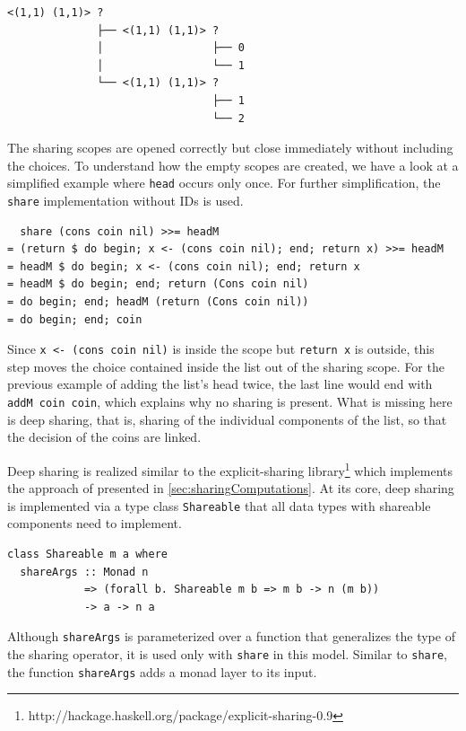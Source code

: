 \documentclass[a4paper, 11pt, fleqn, twoside]{scrreprt}
\newcommand{\todo}[1]{\marginpar{\textbf{TODO:} #1}}
\newcommand{\hinl}[1]{\texttt{#1}}
\begin{document}
\begin{verbatim}
<(1,1) (1,1)> ? 
              ├── <(1,1) (1,1)> ? 
              │                 ├── 0
              │                 └── 1
              └── <(1,1) (1,1)> ? 
                                ├── 1
                                └── 2
\end{verbatim}

The sharing scopes are opened correctly but close immediately without including the choices.
To understand how the empty scopes are created, we have a look at a simplified example where \hinl{head} occurs only once.
For further simplification, the \hinl{share} implementation without IDs is used.

\begin{verbatim}
  share (cons coin nil) >>= headM
= (return $ do begin; x <- (cons coin nil); end; return x) >>= headM
= headM $ do begin; x <- (cons coin nil); end; return x
= headM $ do begin; end; return (Cons coin nil)
= do begin; end; headM (return (Cons coin nil))
= do begin; end; coin
\end{verbatim}

Since \hinl{x <- (cons coin nil)} is inside the scope but \hinl{return x} is outside, this step moves the choice contained inside the list out of the sharing scope.
For the previous example of adding the list's head twice, the last line would end with \hinl{addM coin coin}, which explains why no sharing is present.
What is missing here is deep sharing, that is, sharing of the individual components of the list, so that the decision of the coins are linked.

Deep sharing is realized similar to the explicit-sharing library\footnote{http://hackage.haskell.org/package/explicit-sharing-0.9} which implements the approach of \citep{fischer2009purely} presented in \autoref{sec:sharingComputations}.
At its core, deep sharing is implemented via a type class \hinl{Shareable} that all data types with shareable components need to implement.

\begin{verbatim}
class Shareable m a where
  shareArgs :: Monad n 
            => (forall b. Shareable m b => m b -> n (m b))
            -> a -> n a
\end{verbatim}

Although \hinl{shareArgs} is parameterized over a function that generalizes the type of the sharing operator, it is used only with \hinl{share} in this model.
Similar to \hinl{share}, the function \hinl{shareArgs} adds a monad layer to its input.
\todo{Why?}
\end{document}
